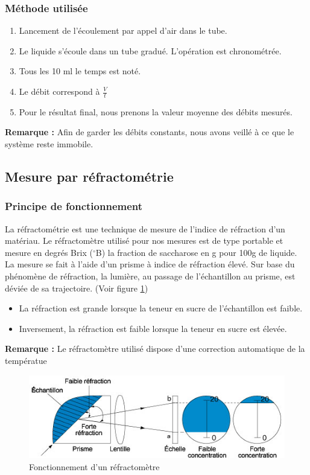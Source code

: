 \documentclass[a4paper,11pt]{article}
\begin{document}
		\subsubsection{Méthode utilisée}
			\begin{enumerate}
				\item Lancement de l'écoulement par appel d'air dans le tube.
				\item Le liquide s'écoule dans un tube gradué. L'opération est chronométrée.
				\item Tous les 10 ml le temps est noté. 
				\item Le débit correspond à $\frac{V}{t}$
				\item Pour le résultat final, nous prenons la valeur moyenne des débits mesurés.
			\end{enumerate}
			\textbf{Remarque :} Afin de garder les débits constants, nous avons veillé à ce que le système reste immobile.
	\subsection{Mesure par réfractométrie}
		\subsubsection{Principe de fonctionnement}
			La réfractométrie est une technique de mesure de l'indice de réfraction d'un matériau. Le réfractomètre utilisé pour nos mesures est de type portable et mesure en degrés Brix ($^{\circ}$B) la fraction de saccharose en g pour 100g de liquide. La mesure se fait à l'aide d'un prisme à indice de réfraction élevé. Sur base du phénomène de réfraction, la lumière, au passage de l'échantillon au prisme, est déviée de sa trajectoire. (Voir figure \ref{refractometrie})
			\begin{itemize}
				\item La réfraction est grande lorsque la teneur en sucre de l'échantillon est faible.
				\item Inversement, la réfraction est faible lorsque la teneur en sucre est élevée.
			\end{itemize}
			\textbf{Remarque :} Le réfractomètre utilisé dispose d'une correction automatique de la températue
			\begin{figure}[h]
				\centering
				\includegraphics[width=1.0\textwidth]{pictures/refractometre.jpg}
				\caption{Fonctionnement d'un réfractomètre \label{refractometrie}}
			\end{figure}
\end{document}
